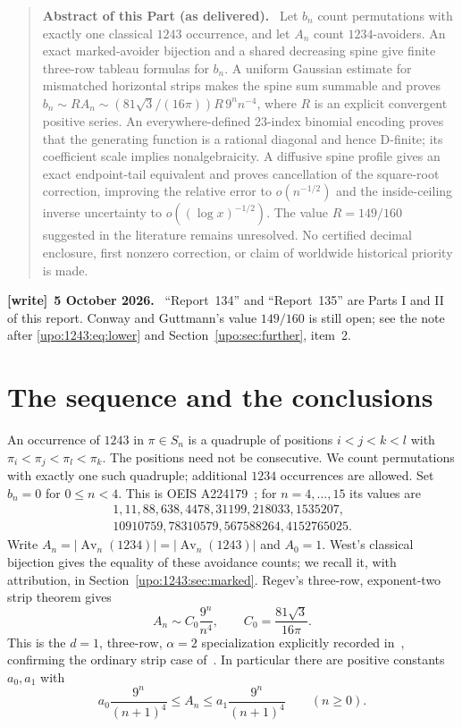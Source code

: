 \documentclass[11pt,letterpaper]{article}
\theoremstyle{remark}\newtheorem{remark}[theorem]{Remark}
\numberwithin{equation}{section}
\newcommand{\Av}{\operatorname{Av}}
\newenvironment{writenote}[1][]{\par\smallskip\begingroup\small
 \noindent\textbf{[write]}\if\relax\detokenize{#1}\relax\else~\textbf{#1.}\fi\ }%
 {\par\endgroup\smallskip}
\newenvironment{partabstract}{\begin{quote}\small\noindent\textbf{Abstract of this Part (as delivered).}\ }{\end{quote}}
\begin{document}
\begin{partabstract}
Let $b_n$ count permutations with exactly one classical $1243$ occurrence,
and let $A_n$ count $1234$-avoiders. An exact marked-avoider bijection and a
shared decreasing spine give finite three-row tableau formulas for $b_n$.
A uniform Gaussian estimate for mismatched horizontal strips makes the
spine sum summable and proves
$b_n\sim R A_n\sim (81\sqrt3/(16\pi))R\,9^n n^{-4}$, where $R$ is an
explicit convergent positive series. An everywhere-defined 23-index
binomial encoding proves that the generating function is a rational
diagonal and hence D-finite; its coefficient scale implies
nonalgebraicity. A diffusive spine profile gives an exact endpoint-tail equivalent and
proves cancellation of the square-root correction, improving the relative
error to $o(n^{-1/2})$ and the inside-ceiling inverse uncertainty to
$o((\log x)^{-1/2})$. The value $R=149/160$ suggested in the literature remains
unresolved. No certified decimal enclosure, first nonzero correction,
or claim of worldwide historical priority is made.
\end{partabstract}
\begin{writenote}[5 October 2026]
``Report~134'' and ``Report~135'' \cite{R134,R135} are Parts I and II of this report. Conway and Guttmann's value $149/160$ is still open; see the note after \eqref{upo:1243:eq:lower} and Section~\ref{upo:sec:further}, item~2.
\end{writenote}


\section{The sequence and the conclusions}\label{upo:1243:sec:intro}
An occurrence of $1243$ in $\pi\in S_n$ is a quadruple of positions
$i<j<k<l$ with $\pi_i<\pi_j<\pi_l<\pi_k$. The positions need not be
consecutive. We count permutations with exactly one such quadruple;
additional $1234$ occurrences are allowed. Set $b_n=0$ for $0\le n<4$.
This is OEIS A224179~\cite{OEIS224179}; for $n=4,\ldots,15$ its values are
\begin{gather*}
1,11,88,638,4478,31199,218033,1535207,\\
10910759,78310579,567588264,4152765025.
\end{gather*}
Write $A_n=|\Av_n(1234)|=|\Av_n(1243)|$ and $A_0=1$.
West's classical bijection gives the equality of these avoidance counts;
we recall it, with attribution, in Section~\ref{upo:1243:sec:marked}.
Regev's three-row, exponent-two strip theorem gives
\begin{equation}\label{upo:1243:eq:regev}
 A_n\sim C_0\frac{9^n}{n^4},\qquad C_0=\frac{81\sqrt3}{16\pi}.
\end{equation}
This is the $d=1$, three-row, $\alpha=2$ specialization explicitly
recorded in~\cite[Section 3.1.4]{Regev2010}, confirming the ordinary strip
case of~\cite{Regev1981}. In particular there are positive constants
$a_0,a_1$ with
\begin{equation}\label{upo:1243:eq:Aglobal}
 a_0\frac{9^n}{(n+1)^4}\le A_n\le a_1\frac{9^n}{(n+1)^4}
 \qquad(n\ge0).
\end{equation}
\end{document}
